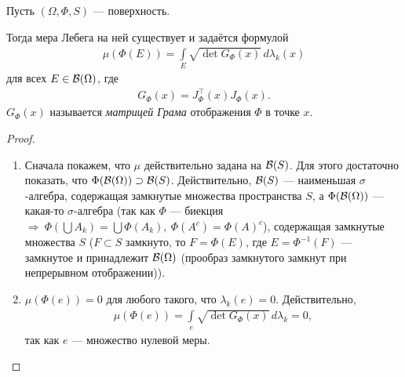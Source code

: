 \begin{thm}
 Пусть $(\Omega, \Phi, S)$  --- поверхность.

 Тогда мера Лебега на ней существует и задаётся формулой
 \begin{align*}
  \mu(\Phi(E)) = \int\limits_{E} \sqrt{ \det G_{\Phi}(x) } \, d\lambda_k(x)
 \end{align*} для всех $E \in \mathcal{B}(\Omega)$, где
 \begin{align}
  \label{equation:lebesgue_measure_on_surface_formula}
  G_{\Phi}(x) = J_{\Phi}^{\top}(x) J_{\Phi}(x)
 .\end{align}  $G_{\Phi}(x)$ называется \textit{матрицей Грама} отображения $\Phi$ в точке $x$.
\end{thm}
\begin{proof}\
 \begin{enumerate}
 \item Сначала покажем, что $\mu$ действительно задана на $\mathcal{B}(S)$. Для этого достаточно показать, что $\Phi(\mathcal{B}(\Omega)) \supset \mathcal{B}(S)$. Действительно, $\mathcal{B}(S)$ --- наименьшая $\sigma$-алгебра, содержащая замкнутые множества пространства $S$, а $\Phi(\mathcal{B}(\Omega))$ --- какая-то $\sigma$-алгебра (так как $\Phi$ --- биекция $\Rightarrow \ \Phi(\bigcup A_k) = \bigcup \Phi(A_k), \ \Phi(A^c) = \Phi(A)^c$), содержащая замкнутые множества $S$ ($F \subset S$ замкнуто, то $F = \Phi(E)$, где $E = \Phi^{-1}(F)$ --- замкнутое и принадлежит $\mathcal{B}(\Omega)$ (прообраз замкнутого замкнут при непрерывном отображении)).

 \item $\mu(\Phi(e)) = 0$ для любого такого, что  $\lambda_k(e) = 0$. Действительно,
   \begin{align*}
    \mu(\Phi(e)) = \int\limits_{e} \sqrt{\det G_{\Phi}(x)} \, d\lambda_k = 0
  ,\end{align*} так как $e$ --- множество нулевой меры.


\end{enumerate}
\end{proof}
